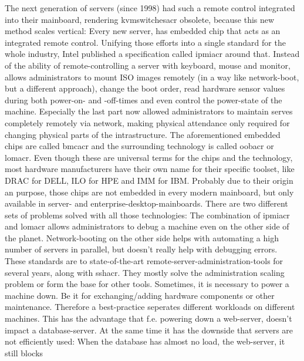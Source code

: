 The next generation of servers (since 1998) had such a remote control integrated into their mainboard, rendering \gls{kvmswitchesacr} obsolete, because this new method scales vertical: Every new server, has embedded chip that acts as an integrated remote control. Unifying those efforts into a single standard for the whole industry, Intel published a specification called \gls{ipmiacr} around that. Instead of  the ability of remote-controlling a server with keyboard, mouse and monitor,  allows administrators to mount ISO images remotely (in a way like network-boot, but a different approach), change the boot order, read hardware sensor values during both power-on- and -off-times and even control the power-state of the machine. Especially the last part now allowed administrators to maintain serves completely remotely via network, making physical attendance only required for changing physical parts of the intrastructure. The aforementioned embedded chips are called \gls{bmcacr} and the surrounding technology is called \gls{oobacr} or \gls{lomacr}. Even though these are universal terms for the chips and the technology, most hardware manufacturers have their own name for their specific toolset, like DRAC for DELL, ILO for HPE and IMM for IBM. Probably due to their origin an purpose, those chips are not embedded in every modern mainboard, but only available in server- and enterprise-desktop-mainboards.
\newline
There are two different sets of problems solved with all those technologies:
The combination of \gls{ipmiacr} and \gls{lomacr} allows administrators to debug a machine even on the other side of the planet. %
Network-booting on the other side helps with automating a high number of servers in parallel, but doesn't really help with debugging errors.
\newline
These standards are to state-of-the-art remote-server-administration-tools for several years, along with \gls{sshacr}. They mostly solve the administration scaling problem or form the base for other tools. %
\newline
Sometimes, it is necessary to power a machine down. Be it for exchanging/adding hardware components or other maintenance. Therefore a best-practice seperates different workloads on different machines. This has the advantage that f.e. powering down a web-server, doesn't impact a database-server. At the same time it has the downside that servers are not efficiently used: When the database has almost no load, the web-server, it still blocks





